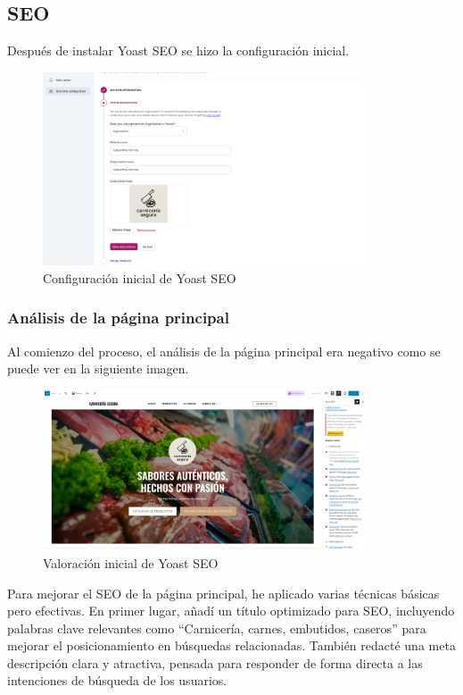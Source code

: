 \documentclass[a4paper]{article}
\begin{document}
\subsection{SEO}

Después de instalar Yoast SEO se hizo la configuración inicial.

\begin{figure}[H]
    \centering
    \includegraphics[width=0.85\textwidth]{images/yoast1.png}
    \caption{Configuración inicial de Yoast SEO}
\end{figure}

\subsubsection{Análisis de la página principal}

Al comienzo del proceso, el análisis de la página principal era negativo como se puede ver en la siguiente imagen.

\begin{figure}[H]
    \centering
    \includegraphics[width=0.85\textwidth]{images/yoastl1.png}
    \caption{Valoración inicial de Yoast SEO}
\end{figure}

Para mejorar el SEO de la página principal, he aplicado varias técnicas básicas pero efectivas. En primer lugar, añadí un título optimizado para SEO, incluyendo palabras clave relevantes como “Carnicería, carnes, embutidos, caseros” para mejorar el posicionamiento en búsquedas relacionadas. También redacté una meta descripción clara y atractiva, pensada para responder de forma directa a las intenciones de búsqueda de los usuarios.
\end{document}
